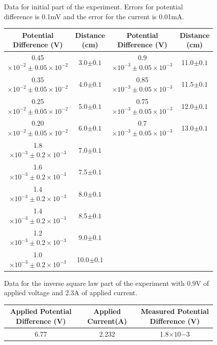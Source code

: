 \documentclass[10pt,a4paper]{article}
\begin{document}
{\begin{center}
\begin{figure} [H]
		\caption{Data for initial part of the experiment. Errors for potential difference is 0.1mV and the error for the current is 0.01mA. }
	\end{figure}
\end{center}
\begin{center}
	\begin{figure} [H] 
		\begin{tabular}{|c |c||c|c|} \hline
			Potential Difference (V)& Distance (cm) & Potential Difference (V)& Distance (cm)\\ [0.5ex] 
			\hline
			0.45$\times10^{-2} \pm 0.05\times10^{-2}$ & 3.0$\pm0.1$ & 0.9$\times10^{-3} \pm 0.05\times10^{-3}$ &11.0$\pm0.1$\\
			\hline
			0.35$\times10^{-2} \pm 0.05\times10^{-2}$ & 4.0$\pm0.1$&0.85$\times10^{-3} \pm 0.05\times10^{-3}$ & 11.5$\pm0.1$\\
			\hline 
			0.25$\times10^{-2} \pm 0.05\times10^{-2}$ & 5.0$\pm0.1$ & 0.75$\times10^{-3} \pm 0.05\times10^{-3}$ &12.0$\pm0.1$\\
			\hline 
			0.20$\times10^{-2} \pm 0.05\times10^{-2}$ & 6.0$\pm0.1$ & 0.7$\times10^{-3} \pm 0.05\times10^{-3}$ & 13.0$\pm0.1$\\
			\hline 
			1.8$\times10^{-3} \pm 0.2\times10^{-3}$ & 7.0$\pm0.1$ &  & \\
			\hline 
			1.6$\times10^{-3} \pm 0.2\times10^{-3}$ & 7.5$\pm0.1$ &  &\\
			\hline 
			1.4$\times10^{-3} \pm 0.2\times10^{-3}$ & 8.0$\pm0.1$ &   & \\
			\hline
			1.4$\times10^{-3} \pm 0.2\times10^{-3}$&8.5$\pm0.1$& &\\
			\hline
			1.2$\times10^{-3} \pm 0.2\times10^{-3}$&9.0$\pm0.1$& &\\
			\hline
			1.0$\times10^{-3} \pm 0.2\times10^{-3}$&10.0$\pm0.1$& &\\
			\hline
		\end{tabular}
		\caption{Data for the inverse square law part of the experiment with 0.9V of applied voltage and 2.3A of applied current.}
	\end{figure}
\end{center}
\begin{center}
	\begin{figure} [H] 
		\begin{tabular}{|c |c|c|} \hline
			Applied Potential Difference (V)& Applied Current(A) & Measured Potential Difference (V)\\ [0.5ex] 
			\hline
			6.77 & 2.232 & 1.8$\times10{-3}$\\

\end{tabular}
\end{figure}
\end{center}}
\end{document}
